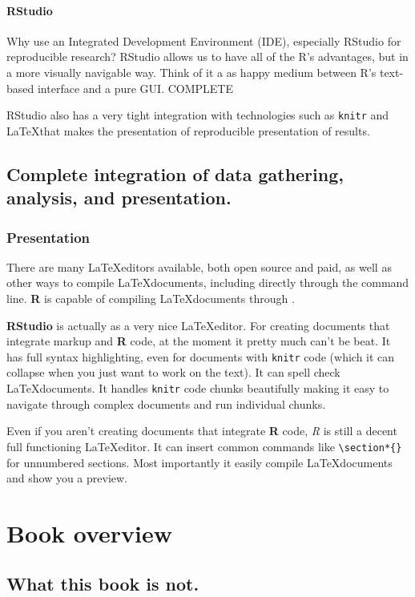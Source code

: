 \documentclass[ChapterTOCs,krantz1]{krantz}\usepackage{graphicx, color}
\begin{document}
\paragraph{RStudio}
Why use an Integrated Development Environment (IDE), especially RStudio for reproducible research? RStudio allows us to have all of the R's advantages, but in a more visually navigable way. Think of it a as happy medium between R's text-based interface and a pure GUI. COMPLETE

RStudio also has a very tight integration with technologies such as {\tt{knitr}} and \LaTeX that makes the presentation of reproducible presentation of results. 

\subsection{Complete integration of data gathering, analysis, and
presentation.}

\subsubsection{Presentation}

There are many \LaTeX editors available, both open source and paid, as
well as other ways to compile \LaTeX documents, including directly
through the command line. \textbf{R} is capable of compiling
\LaTeX documents through .

\textbf{RStudio} is actually as a very nice \LaTeX editor. For creating
documents that integrate markup and \textbf{R} code, at the moment it
pretty much can't be beat. It has full syntax highlighting, even for
documents with \texttt{knitr} code (which it can collapse when you just
want to work on the text). It can spell check \LaTeX documents. It
handles \texttt{knitr} code chunks beautifully making it easy to
navigate through complex documents and run individual chunks.

Even if you aren't creating documents that integrate \textbf{R} code,
\emph{R} is still a decent full functioning \LaTeX editor. It can insert
common commands like \texttt{\textbackslash{}section*\{\}} for
unnumbered sections. Most importantly it easily compile \LaTeX documents
and show you a preview.

\section{Book overview}

\subsection{What this book is not.}
\end{document}
